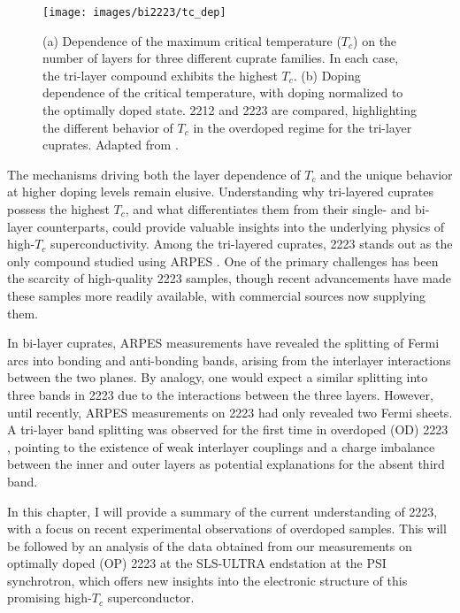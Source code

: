 \begin{figure}
	\centering
	\texttt{[image: images/bi2223/tc\_dep]}
	\caption{(a) Dependence of the maximum critical temperature ($T_c$) on the number of  layers for three different cuprate families. In each case, the tri-layer compound exhibits the highest $T_c$. (b) Doping dependence of the critical temperature, with doping normalized to the optimally doped state. 2212 and 2223 are compared, highlighting the different behavior of $T_c$ in the overdoped regime for the tri-layer cuprates. Adapted from \cite{luo_electronic_2023}.}
	\label{fig:tcdep}
\end{figure}

The mechanisms driving both the layer dependence of $T_c$ and the unique behavior at higher doping levels remain elusive.
Understanding why tri-layered cuprates possess the highest $T_c$, and what differentiates them from their single- and bi-layer counterparts, could provide valuable insights into the underlying physics of high-$T_c$ superconductivity.
Among the tri-layered cuprates, 2223 stands out as the only compound studied using ARPES \cite{feng_electronic_2002,muller_fermi_2002,sato_low_2002,matsui_bcs-like_2003,ideta_angle-resolved_2010, ideta_enhanced_2010, ideta_energy_2012,kunisada_observation_2017,ideta_hybridization_2021,luo_electronic_2023}.
One of the primary challenges has been the scarcity of high-quality 2223 samples, though recent advancements have made these samples more readily available, with commercial sources now supplying them.

In bi-layer cuprates, ARPES measurements have revealed the splitting of Fermi arcs into bonding and anti-bonding bands, arising from the interlayer interactions between the two  planes.
By analogy, one would expect a similar splitting into three bands in 2223 due to the interactions between the three  layers.
However, until recently, ARPES measurements on 2223 had only revealed two Fermi sheets.
A tri-layer band splitting was observed for the first time in overdoped (OD) 2223 \cite{luo_electronic_2023}, pointing to the existence of weak interlayer couplings and a charge imbalance between the inner and outer  layers as potential explanations for the absent third band.

In this chapter, I will provide a summary of the current understanding of 2223, with a focus on recent experimental observations of overdoped samples.
This will be followed by an analysis of the data obtained from our measurements on optimally doped (OP) 2223 at the SLS-ULTRA endstation at the PSI synchrotron, which offers new insights into the electronic structure of this promising high-$T_c$ superconductor.

